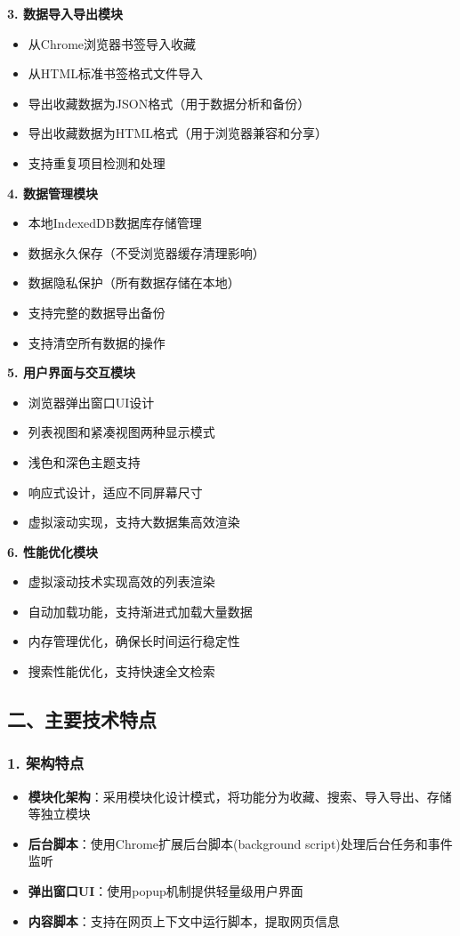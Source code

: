\documentclass[10pt,a4paper]{article}
\begin{document}
\textbf{3. 数据导入导出模块}
\begin{itemize}
  \item 从Chrome浏览器书签导入收藏
  \item 从HTML标准书签格式文件导入
  \item 导出收藏数据为JSON格式（用于数据分析和备份）
  \item 导出收藏数据为HTML格式（用于浏览器兼容和分享）
  \item 支持重复项目检测和处理
\end{itemize}

\textbf{4. 数据管理模块}
\begin{itemize}
  \item 本地IndexedDB数据库存储管理
  \item 数据永久保存（不受浏览器缓存清理影响）
  \item 数据隐私保护（所有数据存储在本地）
  \item 支持完整的数据导出备份
  \item 支持清空所有数据的操作
\end{itemize}

\textbf{5. 用户界面与交互模块}
\begin{itemize}
  \item 浏览器弹出窗口UI设计
  \item 列表视图和紧凑视图两种显示模式
  \item 浅色和深色主题支持
  \item 响应式设计，适应不同屏幕尺寸
  \item 虚拟滚动实现，支持大数据集高效渲染
\end{itemize}

\textbf{6. 性能优化模块}
\begin{itemize}
  \item 虚拟滚动技术实现高效的列表渲染
  \item 自动加载功能，支持渐进式加载大量数据
  \item 内存管理优化，确保长时间运行稳定性
  \item 搜索性能优化，支持快速全文检索
\end{itemize}

\subsection*{二、主要技术特点}

\subsubsection*{1. 架构特点}
\begin{itemize}
  \item \textbf{模块化架构}：采用模块化设计模式，将功能分为收藏、搜索、导入导出、存储等独立模块
  \item \textbf{后台脚本}：使用Chrome扩展后台脚本(background script)处理后台任务和事件监听
  \item \textbf{弹出窗口UI}：使用popup机制提供轻量级用户界面
  \item \textbf{内容脚本}：支持在网页上下文中运行脚本，提取网页信息
\end{itemize}
\end{document}
